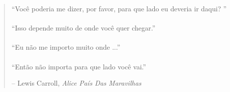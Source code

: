 
\newpage \vspace*{4cm}
\thispagestyle{empty}
\begin{quotation}
\begin{center}
  \large
  \enquote{Você poderia me dizer, por favor, para que lado eu deveria ir daqui? } \\~\\
  \enquote{Isso depende muito de onde você quer chegar.} \\~\\
  \enquote{Eu não me importo muito onde ...} \\~\\
  \enquote{Então não importa para que lado você vai.}
\end{center}
\begin{flushright} -- Lewis Carroll, \textit{Alice País Das Maravilhas}\end{flushright}
\end{quotation}
